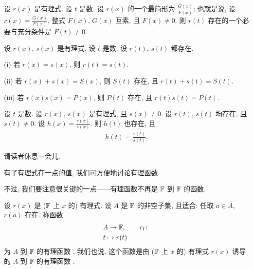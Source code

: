 \begin{proposition}
    设 $r(x)$ 是有理式. 设 $t$ 是数. 设 $r(x)$ 的一个最简形为 $\frac{G(x)}{F(x)}$; 也就是说, 设 $r(x) = \frac{G(x)}{F(x)}$, 整式 $F(x)$, $G(x)$ 互素, 且 $F(x) \neq 0$. 则 $r(t)$ 存在的一个必要与充分条件是 $F(t) \neq 0$.
\end{proposition}

\begin{proposition}
    设 $r(x)$, $s(x)$ 是有理式. 设 $t$ 是数. 设 $r(t)$, $s(t)$ 都存在.

    (i) 若 $r(x) = s(x)$, 则 $r(t) = s(t)$.

    (ii) 若 $r(x) + s(x) = S(x)$, 则 $S(t)$ 存在, 且 $r(t) + s(t) = S(t)$.

    (iii) 若 $r(x) s(x) = P(x)$, 则 $P(t)$ 存在, 且 $r(t) s(t) = P(t)$.
\end{proposition}

\begin{proposition}
    设 $t$ 是数. 设 $r(x)$, $s(x)$ 是有理式, 且 $s(x) \neq 0$. 设 $r(t)$, $s(t)$ 均存在, 且 $s(t) \neq 0$. 设 $h(x) = \frac{r(x)}{s(x)}$. 则 $h(t)$ 也存在, 且
    \begin{align*}
        h(t) = \frac{r(t)}{s(t)}.
    \end{align*}
\end{proposition}

请读者休息一会儿.

\myLine

有了有理式在一点的值, 我们可方便地讨论有理函数.

不过, 我们要注意很关键的一点——有理函数不再是 $\mathbb{F}$ 到 $\mathbb{F}$ 的函数.

\begin{definition}
    设 $r(x)$ 是 ($\mathbb{F}$ 上 $x$ 的) 有理式. 设 $A$ 是 $\mathbb{F}$ 的非空子集, 且适合: 任取 $a \in A$, $r(a)$ 存在. 称函数
    \begin{align*}
         & A \to \FF, \tag*{$r_\mathrm{f} \colon$} \\
         & t \mapsto r(t)
    \end{align*}
    为 $A$ 到 $\mathbb{F}$ 的有理函数 . 我们也说, 这个函数是由 ($\mathbb{F}$ 上 $x$ 的) 有理式 $r(x)$ 诱导的 $A$ 到 $\mathbb{F}$ 的有理函数 .
\end{definition}

